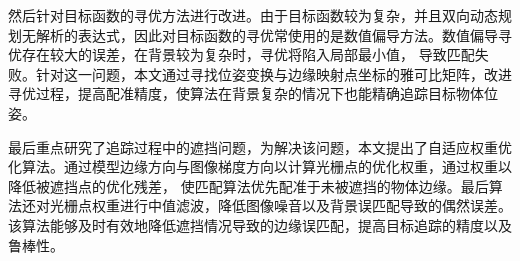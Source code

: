 然后针对目标函数的寻优方法进行改进。由于目标函数较为复杂，并且双向动态规划无解析的表达式，因此对目标函数的寻优常使用的是数值偏导方法。数值偏导寻优存在较大的误差，在背景较为复杂时，寻优将陷入局部最小值，
导致匹配失败。针对这一问题，本文通过寻找位姿变换与边缘映射点坐标的雅可比矩阵，改进寻优过程，提高配准精度，使算法在背景复杂的情况下也能精确追踪目标物体位姿。

最后重点研究了追踪过程中的遮挡问题，为解决该问题，本文提出了自适应权重优化算法。通过模型边缘方向与图像梯度方向以计算光栅点的优化权重，通过权重以降低被遮挡点的优化残差，
使匹配算法优先配准于未被遮挡的物体边缘。最后算法还对光栅点权重进行中值滤波，降低图像噪音以及背景误匹配导致的偶然误差。该算法能够及时有效地降低遮挡情况导致的边缘误匹配，提高目标追踪的精度以及鲁棒性。